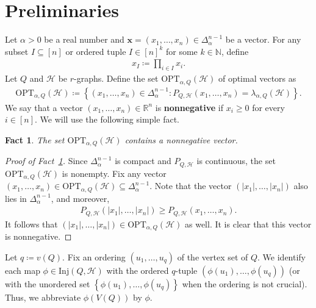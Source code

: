 \documentclass[11pt,a4paper]{article}
\newtheorem{fact}[definition]{Fact}
\begin{document}
\section{Preliminaries}\label{SEC:Prelim}
%
Let $\alpha > 0$ be a real number and $\mathbf{x} = (x_1, \ldots, x_n) \in \Delta_{\alpha}^{n-1}$ be a vector. 
For any subset $I \subseteq [n]$ or ordered tuple $I \in [n]^{k}$ for some $k \in \mathbb{N}$, define 
\begin{align*}
    x_{I}
    \coloneqq \prod_{i \in I} x_i. 
\end{align*}
%
Let $Q$ and $\mathcal{H}$ be $r$-graphs.
Define the set $\mathrm{OPT}_{\alpha, Q}(\mathcal{H})$ of optimal vectors as
\begin{align*}
    \mathrm{OPT}_{\alpha, Q}(\mathcal{H})
    \coloneqq \left\{ (x_1, \ldots, x_n) \in \Delta_{\alpha}^{n-1} \colon P_{Q,\mathcal{H}}(x_1, \ldots, x_n) = \lambda_{\alpha, Q}(\mathcal{H}) \right\}. 
\end{align*}
%
We say that a vector $(x_1, \ldots, x_n) \in \mathbb{R}^{n}$ is \textbf{nonnegative} if $x_i \ge 0$ for every $i \in [n]$. 
We will use the following simple fact.
%
\begin{fact}\label{FACT:nonnegative-optimal-vector}
    The set $\mathrm{OPT}_{\alpha, Q}(\mathcal{H})$ contains a nonnegative vector. 
\end{fact}
\begin{proof}[Proof of Fact~\ref{FACT:nonnegative-optimal-vector}]
    Since $\Delta_{\alpha}^{n-1}$ is compact and $P_{Q, \mathcal{H}}$ is continuous, the set $\mathrm{OPT}_{\alpha, Q}(\mathcal{H})$ is nonempty. 
    Fix any vector $(x_1, \ldots, x_n) \in \mathrm{OPT}_{\alpha, Q}(\mathcal{H}) \subseteq \Delta_{\alpha}^{n-1}$. Note that the vector $(|x_1|, \ldots, |x_n|)$ also lies in $\Delta_{\alpha}^{n-1}$, and moreover, 
    \begin{align*}
        P_{Q, \mathcal{H}}(|x_1|, \ldots, |x_n|) 
        \ge P_{Q, \mathcal{H}}(x_1, \ldots, x_n). 
    \end{align*}
    It follows that $(|x_1|, \ldots, |x_n|) \in \mathrm{OPT}_{\alpha, Q}(\mathcal{H})$ as well. It is clear that this vector is nonnegative.
\end{proof}
%
Let $q \coloneqq v(Q)$. 
Fix an ordering $(u_1, \ldots, u_{q})$ of the vertex set of $Q$. 
We identify each map $\phi \in \mathrm{Inj}(Q,\mathcal{H})$ with the ordered $q$-tuple $\left(\phi(u_1), \ldots, \phi(u_{q})\right)$ (or with the unordered set $\left\{\phi(u_1), \ldots, \phi(u_{q})\right\}$ when the ordering is not crucial). 
Thus, we abbreviate $\phi(V(Q))$ by $\phi$. 
\end{document}
